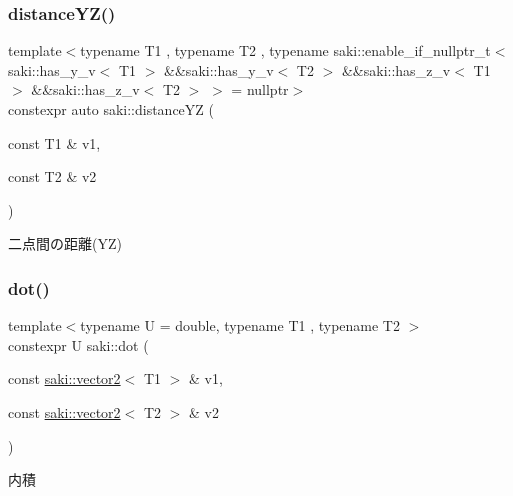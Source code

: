\mbox{\label{namespacesaki_a708a45bd2134a3a276e7acb2566eb8c1}} 
\subsubsection{\texorpdfstring{distance\+Y\+Z()}{distanceYZ()}}
{\footnotesize\ttfamily template$<$typename T1 , typename T2 , typename saki\+::enable\+\_\+if\+\_\+nullptr\+\_\+t$<$ saki\+::has\+\_\+y\+\_\+v$<$ T1 $>$ \&\&saki\+::has\+\_\+y\+\_\+v$<$ T2 $>$ \&\&saki\+::has\+\_\+z\+\_\+v$<$ T1 $>$ \&\&saki\+::has\+\_\+z\+\_\+v$<$ T2 $>$ $>$  = nullptr$>$ \\
constexpr auto saki\+::distance\+YZ (\begin{DoxyParamCaption}\item[{const T1 \&}]{v1,  }\item[{const T2 \&}]{v2 }\end{DoxyParamCaption})}



二点間の距離(\+Y\+Z) 

\mbox{\label{namespacesaki_a820a45ae402c8447bce4fee36a1f7d62}} 
\subsubsection{\texorpdfstring{dot()}{dot()}\hspace{0.1cm}{\footnotesize\ttfamily [1/3]}}
{\footnotesize\ttfamily template$<$typename U  = double, typename T1 , typename T2 $>$ \\
constexpr U saki\+::dot (\begin{DoxyParamCaption}\item[{const \mbox{\hyperlink{classsaki_1_1vector2}{saki\+::vector2}}$<$ T1 $>$ \&}]{v1,  }\item[{const \mbox{\hyperlink{classsaki_1_1vector2}{saki\+::vector2}}$<$ T2 $>$ \&}]{v2 }\end{DoxyParamCaption})}



内積 

\mbox{\label{namespacesaki_a5be905d72bf8dc80abc703fe69fa6fec}} 
